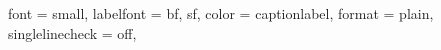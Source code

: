 
\lefoot*%
{%
    \vspace*{1 ex}%
    {\color{stroke1}\rule{\myoutermargin - \mymargininnersep}{0.5 mm}}\\
    \begin{minipage}[b]{\myoutermargin - \mymargininnersep}%
        \raggedleft\normalfont\color{footerpagenr}\textbf{\thepage}%
    \end{minipage}%
}
\rofoot*%
{%
    {\color{stroke1}\rule{\myoutermargin - \mymargininnersep}{0.5 mm}}\\
    \begin{minipage}[b]{\myoutermargin - \mymargininnersep}%
        \raggedright\normalfont\color{footerpagenr}\textbf{\thepage}%
    \end{minipage}%
}



\usepackage{caption}
\captionsetup
{
    font = small,
    labelfont = {bf, sf, color = captionlabel},
    format = plain,
    singlelinecheck = off,
}


\usepackage{tikz} %

\newlength{\mytmpa}
\setlength{\mytmpa}{1 mm}
\newlength{\mytmpb}
\newlength{\mytmpc}

